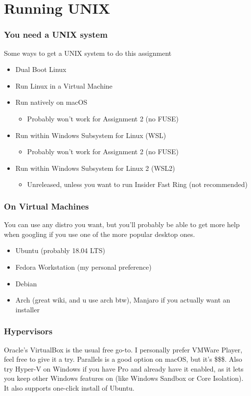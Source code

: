\documentclass{beamer}
\begin{document}
\section{Running UNIX}
\begin{frame}
  \frametitle{You need a UNIX system}
  Some ways to get a UNIX system to do this assignment
  \begin{itemize}
    \item Dual Boot Linux
    \item Run Linux in a Virtual Machine
    \item Run natively on macOS
    \begin{itemize}
      \item Probably won't work for Assignment 2 (no FUSE)
    \end{itemize}
    \item Run within Windows Subsystem for Linux (WSL)
    \begin{itemize}
      \item Probably won't work for Assignment 2 (no FUSE)
    \end{itemize}
    \item Run within Windows Subsystem for Linux 2 (WSL2)
    \begin{itemize}
      \item Unreleased, unless you want to run Insider Fast Ring (not recommended)
    \end{itemize}
  \end{itemize}
\end{frame}
\begin{frame}
  \frametitle{On Virtual Machines}
  You can use any distro you want, but you'll probably be able to get more help when googling if you use one of the more popular desktop ones.
  \begin{itemize}
    \item Ubuntu (probably 18.04 LTS)
    \item Fedora Workstation (my personal preference)
    \item Debian
    \item Arch (great wiki, and u use arch btw), Manjaro if you actually want an installer
  \end{itemize}
\end{frame}
\begin{frame}
  \frametitle{Hypervisors}
  Oracle's VirtualBox is the usual free go-to. I personally prefer VMWare Player, feel free to give it a try. Parallels is a good option on macOS, but it's \$\$\$.\newline
  \newline
  Also try Hyper-V on Windows if you have Pro and already have it enabled, as it lets you keep other Windows features on (like Windows Sandbox or Core Isolation). It also supports one-click install of Ubuntu.
\end{frame}
\end{document}
